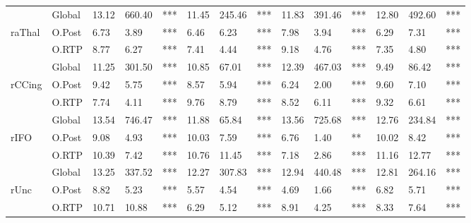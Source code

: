 \begin{tabular}{lllll|lll|lll|lll}
 & \multicolumn{1}{l|}{Global} & 13.12 & 660.40 & *** & 11.45 & 245.46 & *** & 11.83 & 391.46 & *** & 12.80 & 492.60 & *** \\
raThal & \multicolumn{1}{l|}{\cellcolor[HTML]{C0C0C0}O.Post} & \cellcolor[HTML]{C0C0C0}6.73 & \cellcolor[HTML]{C0C0C0}3.89 & \cellcolor[HTML]{C0C0C0}*** & \cellcolor[HTML]{C0C0C0}6.46 & \cellcolor[HTML]{C0C0C0}6.23 & \cellcolor[HTML]{C0C0C0}*** & \cellcolor[HTML]{C0C0C0}7.98 & \cellcolor[HTML]{C0C0C0}3.94 & \cellcolor[HTML]{C0C0C0}*** & \cellcolor[HTML]{C0C0C0}6.29 & \cellcolor[HTML]{C0C0C0}7.31 & \cellcolor[HTML]{C0C0C0}*** \\
 & \multicolumn{1}{l|}{O.RTP} & 8.77 & 6.27 & *** & 7.41 & 4.44 & *** & 9.18 & 4.76 & *** & 7.35 & 4.80 & *** \\
\rowcolor[HTML]{EFEFEF}
 & \multicolumn{1}{l|}{\cellcolor[HTML]{EFEFEF}Global} & 11.25 & 301.50 & *** & 10.85 & 67.01 & *** & 12.39 & 467.03 & *** & 9.49 & 86.42 & *** \\
\rowcolor[HTML]{C0C0C0}
\cellcolor[HTML]{EFEFEF}rCCing & \multicolumn{1}{l|}{\cellcolor[HTML]{C0C0C0}O.Post} & 9.42 & 5.75 & *** & 8.57 & 5.94 & *** & 6.24 & 2.00 & *** & 9.60 & 7.10 & *** \\
\rowcolor[HTML]{EFEFEF}
 & \multicolumn{1}{l|}{\cellcolor[HTML]{EFEFEF}O.RTP} & 7.74 & 4.11 & *** & 9.76 & 8.79 & *** & 8.52 & 6.11 & *** & 9.32 & 6.61 & *** \\
 & \multicolumn{1}{l|}{Global} & 13.54 & 746.47 & *** & 11.88 & 65.84 & *** & 13.56 & 725.68 & *** & 12.76 & 234.84 & *** \\
rIFO & \multicolumn{1}{l|}{\cellcolor[HTML]{C0C0C0}O.Post} & \cellcolor[HTML]{C0C0C0}9.08 & \cellcolor[HTML]{C0C0C0}4.93 & \cellcolor[HTML]{C0C0C0}*** & \cellcolor[HTML]{C0C0C0}10.03 & \cellcolor[HTML]{C0C0C0}7.59 & \cellcolor[HTML]{C0C0C0}*** & \cellcolor[HTML]{C0C0C0}6.76 & \cellcolor[HTML]{C0C0C0}1.40 & \cellcolor[HTML]{C0C0C0}** & \cellcolor[HTML]{C0C0C0}10.02 & \cellcolor[HTML]{C0C0C0}8.42 & \cellcolor[HTML]{C0C0C0}*** \\
 & \multicolumn{1}{l|}{O.RTP} & 10.39 & 7.42 & *** & 10.76 & 11.45 & *** & 7.18 & 2.86 & *** & 11.16 & 12.77 & *** \\
\rowcolor[HTML]{EFEFEF}
 & \multicolumn{1}{l|}{\cellcolor[HTML]{EFEFEF}Global} & 13.25 & 337.52 & *** & 12.27 & 307.83 & *** & 12.94 & 440.48 & *** & 12.81 & 264.16 & *** \\
\rowcolor[HTML]{C0C0C0}
\cellcolor[HTML]{EFEFEF}rUnc & \multicolumn{1}{l|}{\cellcolor[HTML]{C0C0C0}O.Post} & 8.82 & 5.23 & *** & 5.57 & 4.54 & *** & 4.69 & 1.66 & *** & 6.82 & 5.71 & *** \\
\rowcolor[HTML]{EFEFEF}
 & \multicolumn{1}{l|}{\cellcolor[HTML]{EFEFEF}O.RTP} & 10.71 & 10.88 & *** & 6.29 & 5.12 & *** & 8.91 & 4.25 & *** & 8.33 & 7.64 & ***
\end{tabular}
